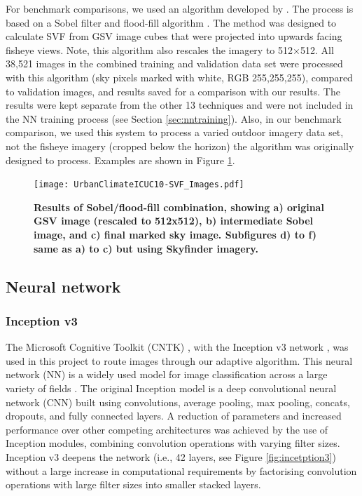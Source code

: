 \documentclass[final,3p,times,authoryear]{elsarticle}
\begin{document}
For benchmark comparisons, we used an algorithm developed by \cite{Middel2018}. The process is based on a Sobel filter \citep{Sobel1968} and flood-fill algorithm \citep{Laungrungthip2008,Middel2017}. The method was designed to calculate SVF from GSV image cubes that were projected into upwards facing fisheye views. Note, this algorithm also rescales the imagery to 512$\times$512. All 38,521 images in the combined training and validation data set were processed with this algorithm (sky pixels marked with white, RGB 255,255,255), compared to validation images, and results saved for a comparison with our results. The results were kept separate from the other 13 techniques and were not included in the NN training process (see Section \ref{sec:nntraining}). Also, in our benchmark comparison, we used this system to process a varied outdoor imagery data set, not the fisheye imagery (cropped below the horizon) the algorithm was originally designed to process. Examples are shown in Figure \ref{fig:sobelflood}.



\begin{figure}
\centering 
\texttt{[image: UrbanClimateICUC10-SVF\_Images.pdf]} 
\caption{\bf Results of Sobel/flood-fill combination, showing a) original GSV image (rescaled to 512x512), b) intermediate Sobel image, and c) final marked sky image. Subfigures d) to f) same as a) to c) but using Skyfinder imagery.}    
 \label{fig:sobelflood}  
\end{figure} 

\subsection{Neural network}\label{sec:nn}

\subsubsection{Inception v3}\label{sec:inception}
The Microsoft Cognitive Toolkit (CNTK) \citep{Yu2015,Agarwal2016}, with the Inception v3 network \citep{Szegedy2015a}, was used in this project to route images through our adaptive algorithm. This neural network (NN) is a widely used model for image classification across a large variety of fields \citep{Xia2017,Hassannejad2016}. The original Inception model \citep{Szegedy2015} is a deep convolutional neural network (CNN) built using convolutions, average pooling, max pooling, concats, dropouts, and fully connected layers. A reduction of parameters and increased performance over other competing architectures was achieved by the use of Inception modules, combining convolution operations with varying filter sizes. Inception v3 deepens the network (i.e., 42 layers, see Figure \ref{fig:incetption3}) without a large increase in computational requirements by factorising convolution operations with large filter sizes into smaller stacked layers.
\end{document}
